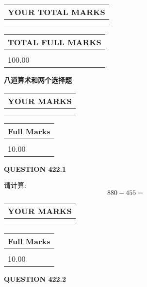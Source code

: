 \documentclass{ctexart}
\begin{document}
   
\vspace{0.2in}\noindent\begin{tabular}{|l|}
\hline
YOUR TOTAL MARKS  \\
\hline
 \\ 
 \\ 
\hline
\end{tabular}
\hspace{0.05in} \begin{tabular}{|l|}
\hline
TOTAL FULL MARKS  \\
\hline
 \\ 
100.00 \\
\hline
\end{tabular}
   
   
 \vspace{0.2in}
{\LARGE {\textbf{ 八道算术和两个选择题}}}
   
   
  
\vspace{0.2in}
  
\noindent\begin{tabular}{|l|}
\hline
 YOUR MARKS  \\
\hline
 \\ 
 \\ 
\hline
\end{tabular}
\hspace{0.05in} \begin{tabular}{|l|}
\hline
 Full Marks  \\
\hline
 \\ 
10.00 \\
\hline
\end{tabular}
{\textbf{\Large{QUESTION
422.1 
}}}
  
  
 
请计算:
\begin{equation}
880 -   %
455 = \nonumber
\end{equation}
 

 

 
  
\vspace{0.2in}
  
\noindent\begin{tabular}{|l|}
\hline
 YOUR MARKS  \\
\hline
 \\ 
 \\ 
\hline
\end{tabular}
\hspace{0.05in} \begin{tabular}{|l|}
\hline
 Full Marks  \\
\hline
 \\ 
10.00 \\
\hline
\end{tabular}
{\textbf{\Large{QUESTION
422.2 
}}}
  
\end{document}
